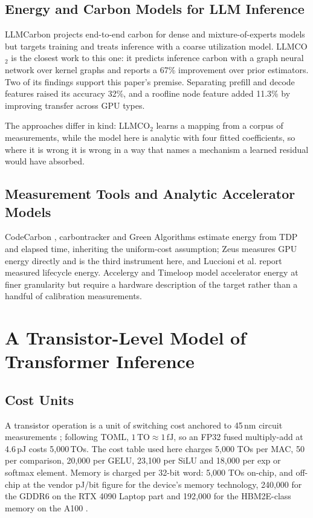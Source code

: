 \documentclass[conference]{IEEEtran}
\begin{document}
\subsection{Energy and Carbon Models for LLM Inference}

LLMCarbon \cite{llmcarbon} projects end-to-end carbon for dense and
mixture-of-experts models but targets training and treats inference with a
coarse utilization model. LLMCO$_2$ \cite{llmco2} is the closest work to
this one: it predicts inference carbon with a graph neural network over
kernel graphs and reports a 67\% improvement over prior estimators. Two of
its findings support this paper's premise. Separating prefill and decode
features raised its accuracy 32\%, and a roofline node feature added 11.3\%
by improving transfer across GPU types.

The approaches differ in kind: LLMCO$_2$ learns a mapping from a corpus of
measurements, while the model here is analytic with four fitted
coefficients, so where it is wrong it is wrong in a way that names a
mechanism a learned residual would have absorbed.

\subsection{Measurement Tools and Analytic Accelerator Models}

CodeCarbon \cite{codecarbon}, carbontracker \cite{carbontracker} and Green
Algorithms \cite{greenalgorithms} estimate energy from TDP and elapsed
time, inheriting the uniform-cost assumption; Zeus \cite{zeus} measures GPU
energy directly and is the third instrument here, and Luccioni et al.
\cite{luccioni2023} report measured lifecycle energy. Accelergy
\cite{accelergy} and Timeloop \cite{timeloop} model accelerator energy at
finer granularity but require a hardware description of the target rather
than a handful of calibration measurements.

\section{A Transistor-Level Model of Transformer Inference}
\label{sec:model}

\subsection{Cost Units}

A transistor operation is a unit of switching cost anchored to 45\,nm
circuit measurements \cite{horowitz2014}; following TOML, $1\,\mathrm{TO}
\approx 1\,\mathrm{fJ}$, so an FP32 fused multiply-add at 4.6\,pJ costs
5{,}000\,TOs. The cost table used here charges 5{,}000 TOs per MAC, 50 per
comparison, 20{,}000 per GELU, 23{,}100 per SiLU and 18{,}000 per exp or
softmax element. Memory is charged per 32-bit word: 5{,}000 TOs on-chip,
and off-chip at the vendor pJ/bit figure for the device's memory technology,
240{,}000 for the GDDR6 on the RTX 4090 Laptop part and 192{,}000 for the
HBM2E-class memory on the A100 \cite{a100datasheet}.
\end{document}
